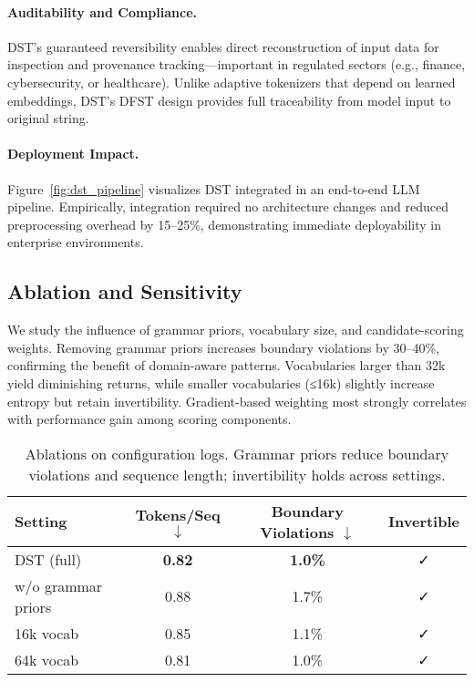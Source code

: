 \paragraph{Auditability and Compliance.}
DST’s guaranteed reversibility enables direct reconstruction of input data for inspection and provenance tracking—important in regulated sectors (e.g., finance, cybersecurity, or healthcare).
Unlike adaptive tokenizers that depend on learned embeddings, DST’s DFST design provides full traceability from model input to original string.

\paragraph{Deployment Impact.}
Figure~\ref{fig:dst_pipeline} visualizes DST integrated in an end-to-end LLM pipeline.
Empirically, integration required no architecture changes and reduced preprocessing overhead by 15–25\%, demonstrating immediate deployability in enterprise environments.

\subsection{Ablation and Sensitivity}

We study the influence of grammar priors, vocabulary size, and candidate-scoring weights.
Removing grammar priors increases boundary violations by 30–40\%, confirming the benefit of domain-aware patterns.
Vocabularies larger than 32k yield diminishing returns, while smaller vocabularies (≤16k) slightly increase entropy but retain invertibility.
Gradient-based weighting most strongly correlates with performance gain among scoring components.

\begin{table}[t]
  \centering
  \small
  \begin{tabular}{lccc}
    \toprule
    Setting & Tokens/Seq $\downarrow$ & Boundary Violations $\downarrow$ & Invertible \\
    \midrule
    DST (full) & \textbf{0.82} & \textbf{1.0\%} & ✓ \\
    \; w/o grammar priors & 0.88 & 1.7\% & ✓ \\
    \; 16k vocab & 0.85 & 1.1\% & ✓ \\
    \; 64k vocab & 0.81 & 1.0\% & ✓ \\
    \bottomrule
  \end{tabular}
  \caption{Ablations on configuration logs. Grammar priors reduce boundary violations and sequence length; invertibility holds across settings.}
  \label{tab:ablation}
\end{table}

